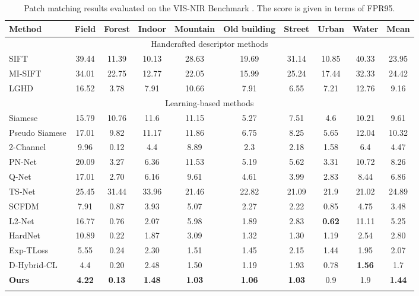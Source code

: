 \documentclass[10pt,journal]{IEEEtran}\usepackage{amsfonts}
\begin{document}
\begin{table*}[tbh]
\centering
\par
\begin{tabular}{lccccccccc}
\toprule Method & Field & Forest & Indoor & Mountain & Old building & Street
& Urban & Water & Mean \\ \midrule
\multicolumn{10}{c}{Handcrafted descriptor methods}  \\ 
SIFT \cite{SIFT} & 39.44 & 11.39 & 10.13 & 28.63 & 19.69 & 31.14 & 10.85 &
40.33 & 23.95 \\
MI-SIFT \cite{MI_SIFT} & 34.01 & 22.75 & 12.77 & 22.05 & 15.99 & 25.24 &
17.44 & 32.33 & 24.42 \\
LGHD \cite{LGHD} & 16.52 & 3.78 & 7.91 & 10.66 & 7.91 & 6.55 & 7.21 & 12.76
& 9.16 \\
\midrule
\multicolumn{10}{c}{Learning-based methods} \\
Siamese \cite{SiameseCrossSpectral} & 15.79 & 10.76 & 11.6 & 11.15 & 5.27 &
7.51 & 4.6 & 10.21 & 9.61 \\
Pseudo Siamese \cite{SiameseCrossSpectral} & 17.01 & 9.82 & 11.17 & 11.86 &
6.75 & 8.25 & 5.65 & 12.04 & 10.32 \\
2-Channel \cite{SiameseCrossSpectral} & 9.96 & 0.12 & 4.4 & 8.89 & 2.3 & 2.18
& 1.58 & 6.4 & 4.47 \\
PN-Net \cite{PN_net} & 20.09 & 3.27 & 6.36 & 11.53 & 5.19 & 5.62 & 3.31 &
10.72 & 8.26 \\
Q-Net \cite{Q-net} & 17.01 & 2.70 & 6.16 & 9.61 & 4.61 & 3.99 & 2.83 & 8.44
& 6.86 \\
TS-Net \cite{TS-net} & 25.45 & 31.44 & 33.96 & 21.46 & 22.82 & 21.09 & 21.9
& 21.02 & 24.89 \\
SCFDM \cite{SCFDM} & 7.91 & 0.87 & 3.93 & 5.07 & 2.27 & 2.22 & 0.85 & 4.75 &
3.48 \\
L2-Net \cite{L2Net} & 16.77 & 0.76 & 2.07 & 5.98 & 1.89 & 2.83 & \textbf{0.62} & 11.11 & 5.25 \\
HardNet \cite{HardNet} & 10.89 & 0.22 & 1.87 & 3.09 & 1.32 & 1.30 & 1.19 &
2.54 & 2.80 \\
Exp-TLoss \cite{BetterAndFaster} & 5.55 & 0.24 & 2.30 & 1.51 & 1.45 & 2.15 &
1.44 & 1.95 & 2.07 \\
D-Hybrid-CL \cite{multisensor} & 4.4 & 0.20 & 2.48 & 1.50 & 1.19 & 1.93 &
0.78 & \textbf{1.56} & 1.7 \\
\textbf{Ours} & \textbf{4.22} & \textbf{0.13} & \textbf{1.48} & \textbf{1.03}
& \textbf{1.06} & \textbf{1.03} & 0.9 & 1.9 & \textbf{1.44} \\
\bottomrule &  &  &  &  &  &  &  &  &
\end{tabular}\caption{Patch matching results evaluated on the VIS-NIR Benchmark
\protect\cite{SiameseCrossSpectral}. The score is given in terms of FPR95.}
\label{tab:visnir}
\end{table*}
\end{document}
